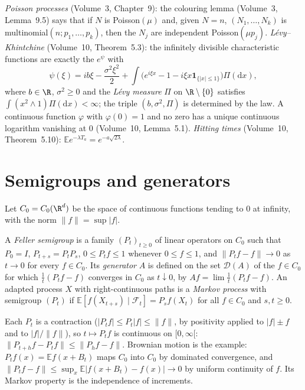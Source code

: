 \begin{reminder}
\emph{Poisson processes} (Volume~3, Chapter~9): the colouring lemma (Volume~3, Lemma~9.5) says that if $N$ is Poisson$(\mu)$ and, given $N=n$, $(N_1,\dots,N_k)$ is multinomial$(n;p_1,\dots,p_k)$, then the $N_j$ are
independent Poisson$(\mu p_j)$. \emph{L\'evy--Khintchine} (Volume~10, Theorem~5.3): the infinitely divisible characteristic functions are exactly the $e^{\psi}$ with
\[
\psi(\xi)=ib\xi-\frac{\sigma^2\xi^2}2+\int\bigl(e^{i\xi x}-1-i\xi x\mathbf 1_{\{|x|\le1\}}\bigr)\Pi(\mathrm dx),
\]
where $b\in\R$, $\sigma^2\ge0$ and the \emph{L\'evy measure} $\Pi$ on $\R\setminus\{0\}$ satisfies $\int(x^2\wedge1)\Pi(\mathrm dx)<\infty$; the triple $(b,\sigma^2,\Pi)$ is determined by the law. A continuous function
$\varphi$ with $\varphi(0)=1$ and no zero has a unique continuous logarithm vanishing at $0$ (Volume~10, Lemma~5.1). \emph{Hitting times} (Volume~10, Theorem~5.10): $\mathbb Ee^{-\lambda T_a}=e^{-a\sqrt{2\lambda}}$.
\end{reminder}

\section{Semigroups and generators}

Let $C_0=C_0(\R^d)$ be the space of continuous functions tending to $0$ at infinity, with the norm $\|f\|=\sup|f|$.

\begin{definition}\label{def:feller}
A \emph{Feller semigroup} is a family $(P_t)_{t\ge0}$ of linear operators on $C_0$ such that $P_0=I$, $P_{t+s}=P_tP_s$, $0\le P_tf\le1$ whenever $0\le f\le1$, and $\|P_tf-f\|\to0$ as $t\to0$ for every
$f\in C_0$. Its \emph{generator} $A$ is defined on the set $\mathcal D(A)$ of the $f\in C_0$ for which $\frac1t(P_tf-f)$ converges in $C_0$ as $t\downarrow0$, by $Af=\lim\frac1t(P_tf-f)$. An adapted process $X$ with
right-continuous paths is a \emph{Markov process} with semigroup $(P_t)$ if $\mathbb E[f(X_{t+s})\mid\mathcal F_t]=P_sf(X_t)$ for all $f\in C_0$ and $s,t\ge0$.
\end{definition}

Each $P_t$ is a contraction ($|P_tf|\le P_t|f|\le\|f\|$, by positivity applied to $|f|\pm f$ and to $|f|/\|f\|$), so $t\mapsto P_tf$ is continuous on $[0,\infty[$: $\|P_{t+h}f-P_tf\|\le\|P_hf-f\|$. Brownian
motion is the example: $P_tf(x)=\mathbb Ef(x+B_t)$ maps $C_0$ into $C_0$ by dominated convergence, and $\|P_tf-f\|\le\sup_x\mathbb E|f(x+B_t)-f(x)|\to0$ by uniform continuity of $f$. Its Markov property is the independence of
increments.

